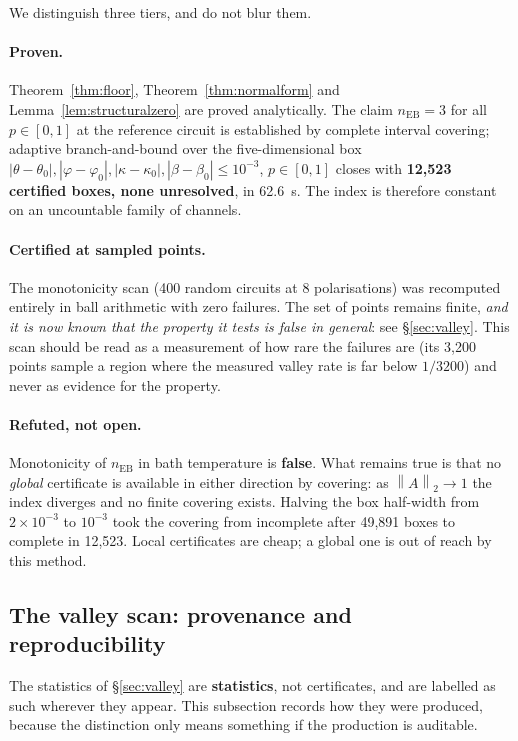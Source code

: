 \documentclass[11pt,a4paper]{article}
\theoremstyle{definition}
\theoremstyle{remark}
\newcommand{\nEB}{n_{\mathrm{EB}}}
\newcommand{\opn}[1]{\left\lVert #1 \right\rVert_{2}}
\begin{document}
We distinguish three tiers, and do not blur them.

\paragraph{Proven.} Theorem~\ref{thm:floor}, Theorem~\ref{thm:normalform} and Lemma~\ref{lem:structuralzero} are proved analytically. The claim $\nEB = 3$ for all $p \in [0,1]$ at the reference circuit is established by complete interval covering; adaptive branch-and-bound over the five-dimensional box $|\theta-\theta_0|,|\varphi-\varphi_0|,|\kappa-\kappa_0|,|\beta-\beta_0| \le 10^{-3}$, $p \in [0,1]$ closes with \textbf{12,523 certified boxes, none unresolved}, in 62.6~s. The index is therefore constant on an uncountable family of channels.

\paragraph{Certified at sampled points.} The monotonicity scan (400 random circuits at 8 polarisations) was recomputed entirely in ball arithmetic with zero failures. The set of points remains finite, \emph{and it is now known that the property it tests is false in general}: see \S\ref{sec:valley}. This scan should be read as a measurement of how rare the failures are (its 3,200 points sample a region where the measured valley rate is far below $1/3200$) and never as evidence for the property.

\paragraph{Refuted, not open.} Monotonicity of $\nEB$ in bath temperature is \textbf{false}. What remains true is that no \emph{global} certificate is available in either direction by covering: as $\opn{A}\to1$ the index diverges and no finite covering exists. Halving the box half-width from $2\times10^{-3}$ to $10^{-3}$ took the covering from incomplete after 49,891 boxes to complete in 12,523. Local certificates are cheap; a global one is out of reach by this method.

\subsection{The valley scan: provenance and reproducibility}\label{sec:scanprov}

The statistics of \S\ref{sec:valley} are \textbf{statistics}, not certificates, and are labelled as such wherever they appear. This subsection records how they were produced, because the distinction only means something if the production is auditable.
\end{document}
